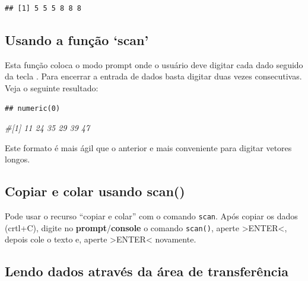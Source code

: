 \documentclass[
]{book}
\newenvironment{Shaded}{\begin{snugshade}}{\end{snugshade}}
\newcommand{\CommentTok}[1]{\textcolor[rgb]{0.56,0.35,0.01}{\textit{#1}}}
\newcommand{\KeywordTok}[1]{\textcolor[rgb]{0.13,0.29,0.53}{\textbf{#1}}}
\newcommand{\NormalTok}[1]{#1}
\newcommand{\StringTok}[1]{\textcolor[rgb]{0.31,0.60,0.02}{#1}}
\begin{document}
\begin{verbatim}
## [1] 5 5 5 8 8 8
\end{verbatim}

\hypertarget{usando-a-funuxe7uxe3o-scan}{%
\subsection{Usando a função `scan'}\label{usando-a-funuxe7uxe3o-scan}}

Esta função coloca o modo prompt onde o usuário deve digitar cada dado seguido da tecla . Para encerrar a entrada de dados basta digitar duas vezes consecutivas. Veja o seguinte resultado:

\begin{Shaded}
\end{Shaded}

\begin{verbatim}
## numeric(0)
\end{verbatim}

\begin{Shaded}
\begin{Highlighting}[]
\CommentTok{#[1] 11 24 35 29 39 47}
\end{Highlighting}
\end{Shaded}

Este formato é mais ágil que o anterior e mais conveniente para digitar vetores longos.

\hypertarget{copiar-e-colar-usando-scan}{%
\subsection{Copiar e colar usando scan()}\label{copiar-e-colar-usando-scan}}

Pode usar o recurso ``copiar e colar'' com o comando \texttt{scan}.
Após copiar os dados (crtl+C), digite no \textbf{prompt}/\textbf{console} o comando \texttt{scan()}, aperte \textgreater ENTER\textless, depois cole o texto e, aperte \textgreater ENTER\textless{} novamente.

\hypertarget{lendo-dados-atravuxe9s-da-uxe1rea-de-transferuxeancia}{%
\subsection{Lendo dados através da área de transferência}\label{lendo-dados-atravuxe9s-da-uxe1rea-de-transferuxeancia}}
\end{document}
